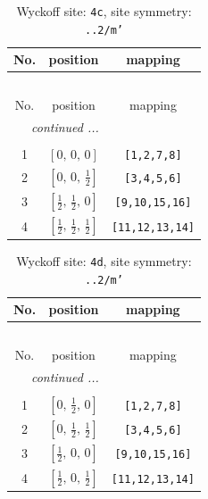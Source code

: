 \documentclass[fleqn,8pt]{jsarticle}
\begin{document}
\renewcommand{\arraystretch}{1.2}
\begin{longtable}{ccc}
\caption{Wyckoff site: {\tt 4c}, site symmetry: {\tt ..2/m'}}
 \\
 \hline \hline
No. & position & mapping \\ \hline \endfirsthead

\multicolumn{2}{l}{\tablename\ \thetable{}} \\
 \hline \hline
No. & position & mapping \\ \hline \endhead

 \hline \hline
\multicolumn{2}{r}{\footnotesize\it continued ...} \\ \endfoot

 \hline \hline
\multicolumn{2}{r}{} \\ \endlastfoot

1 & $\left[ 0,\, 0,\, 0 \right]$ & {\tt [1,2,7,8]} \\ \hline
2 & $\left[ 0,\, 0,\, \frac{1}{2} \right]$ & {\tt [3,4,5,6]} \\ \hline
3 & $\left[ \frac{1}{2},\, \frac{1}{2},\, 0 \right]$ & {\tt [9,10,15,16]} \\ \hline
4 & $\left[ \frac{1}{2},\, \frac{1}{2},\, \frac{1}{2} \right]$ & {\tt [11,12,13,14]} \\
\end{longtable}
\renewcommand{\arraystretch}{1.2}
\begin{longtable}{ccc}
\caption{Wyckoff site: {\tt 4d}, site symmetry: {\tt ..2/m'}}
 \\
 \hline \hline
No. & position & mapping \\ \hline \endfirsthead

\multicolumn{2}{l}{\tablename\ \thetable{}} \\
 \hline \hline
No. & position & mapping \\ \hline \endhead

 \hline \hline
\multicolumn{2}{r}{\footnotesize\it continued ...} \\ \endfoot

 \hline \hline
\multicolumn{2}{r}{} \\ \endlastfoot

1 & $\left[ 0,\, \frac{1}{2},\, 0 \right]$ & {\tt [1,2,7,8]} \\ \hline
2 & $\left[ 0,\, \frac{1}{2},\, \frac{1}{2} \right]$ & {\tt [3,4,5,6]} \\ \hline
3 & $\left[ \frac{1}{2},\, 0,\, 0 \right]$ & {\tt [9,10,15,16]} \\ \hline
4 & $\left[ \frac{1}{2},\, 0,\, \frac{1}{2} \right]$ & {\tt [11,12,13,14]} \\
\end{longtable}
\end{document}
